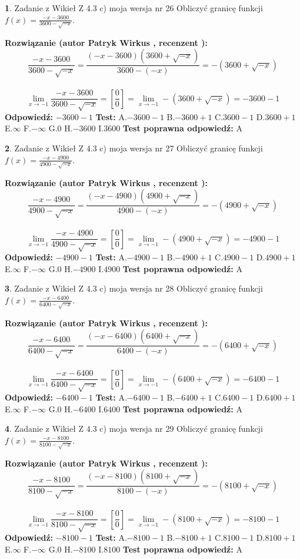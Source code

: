 \documentclass[12pt, a4paper]{article}
\theoremstyle{definition} %
\newtheorem{zad}{}
\newcommand{\zadStart}[1]{\begin{zad}#1\newline}
\newcommand{\zadStop}{\end{zad}}
\newcommand{\rozwStart}[2]{\noindent \textbf{Rozwiązanie (autor #1 , recenzent #2): }\newline}
\newcommand{\rozwStop}{\newline}
\newcommand{\odpStart}{\noindent \textbf{Odpowiedź:}\newline}
\newcommand{\odpStop}{\newline}
\newcommand{\testStart}{\noindent \textbf{Test:}\newline}
\newcommand{\testStop}{\newline}
\newcommand{\kluczStart}{\noindent \textbf{Test poprawna odpowiedź:}\newline}
\newcommand{\kluczStop}{\newline}
\begin{document}
\zadStart{Zadanie z Wikieł Z 4.3 c) moja wersja nr 26}
Obliczyć granicę funkcji $f(x)=\frac{-x-3600}{3600-\sqrt{-x}}$.
\zadStop
\rozwStart{Patryk Wirkus}{}
$$\frac{-x-3600}{3600-\sqrt{-x}}=\frac{(-x-3600)(3600+\sqrt{-x})}{3600-(-x)}=-(3600+\sqrt{-x})$$
\\
$$\lim\limits_{x\to-1}\frac{-x-3600}{3600-\sqrt{-x}}=[\frac{0}{0}]=\lim\limits_{x\to-1}-(3600+\sqrt{-x}) =-3600-1$$
\rozwStop
\odpStart
$-3600-1$
\odpStop
\testStart
A.$-3600-1$
B.$-3600+1$
C.$3600-1$
D.$3600+1$
E.$\infty$
F.$-\infty$
G.$0$
H.$-3600$
I.$3600$
\testStop
\kluczStart
A
\kluczStop



\zadStart{Zadanie z Wikieł Z 4.3 c) moja wersja nr 27}
Obliczyć granicę funkcji $f(x)=\frac{-x-4900}{4900-\sqrt{-x}}$.
\zadStop
\rozwStart{Patryk Wirkus}{}
$$\frac{-x-4900}{4900-\sqrt{-x}}=\frac{(-x-4900)(4900+\sqrt{-x})}{4900-(-x)}=-(4900+\sqrt{-x})$$
\\
$$\lim\limits_{x\to-1}\frac{-x-4900}{4900-\sqrt{-x}}=[\frac{0}{0}]=\lim\limits_{x\to-1}-(4900+\sqrt{-x}) =-4900-1$$
\rozwStop
\odpStart
$-4900-1$
\odpStop
\testStart
A.$-4900-1$
B.$-4900+1$
C.$4900-1$
D.$4900+1$
E.$\infty$
F.$-\infty$
G.$0$
H.$-4900$
I.$4900$
\testStop
\kluczStart
A
\kluczStop



\zadStart{Zadanie z Wikieł Z 4.3 c) moja wersja nr 28}
Obliczyć granicę funkcji $f(x)=\frac{-x-6400}{6400-\sqrt{-x}}$.
\zadStop
\rozwStart{Patryk Wirkus}{}
$$\frac{-x-6400}{6400-\sqrt{-x}}=\frac{(-x-6400)(6400+\sqrt{-x})}{6400-(-x)}=-(6400+\sqrt{-x})$$
\\
$$\lim\limits_{x\to-1}\frac{-x-6400}{6400-\sqrt{-x}}=[\frac{0}{0}]=\lim\limits_{x\to-1}-(6400+\sqrt{-x}) =-6400-1$$
\rozwStop
\odpStart
$-6400-1$
\odpStop
\testStart
A.$-6400-1$
B.$-6400+1$
C.$6400-1$
D.$6400+1$
E.$\infty$
F.$-\infty$
G.$0$
H.$-6400$
I.$6400$
\testStop
\kluczStart
A
\kluczStop



\zadStart{Zadanie z Wikieł Z 4.3 c) moja wersja nr 29}
Obliczyć granicę funkcji $f(x)=\frac{-x-8100}{8100-\sqrt{-x}}$.
\zadStop
\rozwStart{Patryk Wirkus}{}
$$\frac{-x-8100}{8100-\sqrt{-x}}=\frac{(-x-8100)(8100+\sqrt{-x})}{8100-(-x)}=-(8100+\sqrt{-x})$$
\\
$$\lim\limits_{x\to-1}\frac{-x-8100}{8100-\sqrt{-x}}=[\frac{0}{0}]=\lim\limits_{x\to-1}-(8100+\sqrt{-x}) =-8100-1$$
\rozwStop
\odpStart
$-8100-1$
\odpStop
\testStart
A.$-8100-1$
B.$-8100+1$
C.$8100-1$
D.$8100+1$
E.$\infty$
F.$-\infty$
G.$0$
H.$-8100$
I.$8100$
\testStop
\kluczStart
A
\kluczStop
\end{document}
